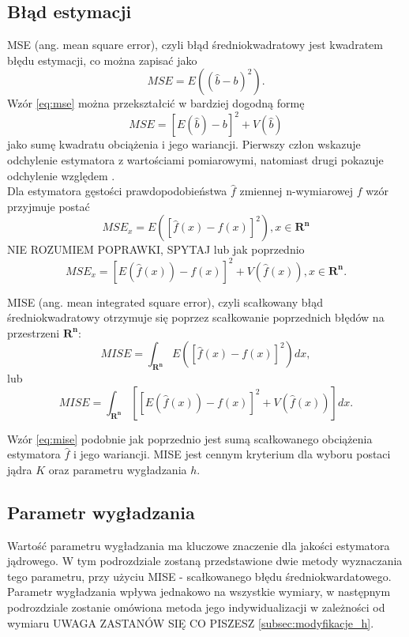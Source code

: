 \subsection{Błąd estymacji}
MSE (ang. mean square error), czyli błąd średniokwadratowy jest kwadratem błędu estymacji, co można zapisać jako
\begin{equation}
\label{eq:mse}
MSE = E({(\hat{b}-b)}^2 ).
\end{equation}
Wzór \ref{eq:mse} można przekształcić w bardziej dogodną formę
\begin{equation}
MSE = {[E(\hat{b})-b]}^2 +V(\hat{b})
\end{equation}
jako sumę kwadratu obciążenia i jego wariancji. Pierwszy człon wskazuje odchylenie  estymatora z wartościami pomiarowymi, natomiast drugi pokazuje odchylenie względem . \\
Dla estymatora gęstości prawdopodobieństwa $\hat{f}$ zmiennej n-wymiarowej $f$ wzór przyjmuje postać
\begin{equation}
MSE_x = E({[\hat{f}(x)-f(x)]}^2), x \in \mathbf{R^n}
\end{equation} NIE ROZUMIEM POPRAWKI, SPYTAJ
lub jak poprzednio
\begin{equation}
MSE_x = {[E(\hat{f}(x))-f(x)]}^2 + V(\hat{f}(x)), x \in \mathbf{R^n}.
\end{equation}

MISE (ang. mean integrated square error), czyli scałkowany błąd średniokwadratowy otrzymuje się poprzez scałkowanie poprzednich błędów na przestrzeni $\mathbf{R^n}$:
\begin{equation}
MISE = \int_{\mathbf{R^n}} E({[\hat{f}(x)-f(x)]}^2) dx,
\end{equation}
lub
\begin{equation}
\label{eq:mise}
MISE = \int_{\mathbf{R^n}} [{[E(\hat{f}(x))-f(x)]}^2 + V(\hat{f}(x))]dx.
\end{equation}

Wzór \eqref{eq:mise} podobnie jak poprzednio jest sumą scałkowanego obciążenia estymatora $\hat{f}$ i jego wariancji. MISE jest cennym kryterium dla wyboru postaci jądra $K$ oraz parametru wygładzania $h$.

\subsection{Parametr wygładzania}

Wartość parametru wygładzania ma kluczowe znaczenie dla jakości estymatora jądrowego. W tym podrozdziale zostaną przedstawione dwie metody wyznaczania tego parametru, przy użyciu MISE - scałkowanego błędu średniokwardatowego. Parametr wygładzania wpływa jednakowo na wszystkie wymiary, w następnym podrozdziale zostanie omówiona metoda jego indywidualizacji w zależności od wymiaru UWAGA ZASTANÓW SIĘ CO PISZESZ \ref{subsec:modyfikacje_h}.

